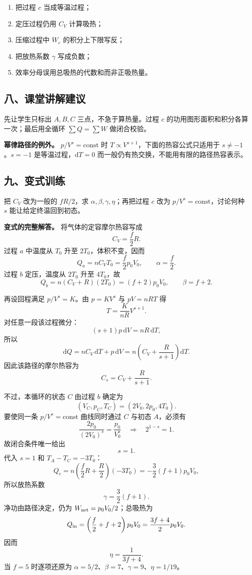 \documentclass[12pt,a4paper,UTF8]{ctexart}
\newcommand{\tightlist}{\setlength{\itemsep}{0pt}\setlength{\parskip}{0pt}}
\begin{document}
\begin{enumerate}
\def\labelenumi{\arabic{enumi}.}
\tightlist
\item
  把过程 \(c\) 当成等温过程；
\item
  定压过程仍用 \(C_V\) 计算吸热；
\item
  压缩过程中 \(W_c\) 的积分上下限写反；
\item
  把放热系数 \(\gamma\) 写成负数；
\item
  效率分母误用总吸热的代数和而非正吸热量。
\end{enumerate}

\subsection{八、课堂讲解建议}\label{ux516bux8bfeux5802ux8bb2ux89e3ux5efaux8bae-5}

先让学生只标出 \(A,B,C\) 三点，不急于算热量。过程 \(c\)
的功用图形面积和积分各算一次；最后用全循环 \(\sum Q=\sum W\)
做闭合校验。

\textbf{幂律路径的例外。} \(p/V^s=\mathrm{const}\) 时
\(T\propto V^{s+1}\)，下面的热容公式只适用于 \(s\ne-1\)。\(s=-1\)
是等温过程，\(\mathrm dT=0\)
而一般仍有热交换，不能用有限的路径热容表示。

\subsection{九、变式训练}\label{ux4e5dux53d8ux5f0fux8badux7ec3-5}

把 \(C_V\) 改为一般的 \(fR/2\)，求
\(\alpha,\beta,\gamma,\eta\)；再把过程 \(c\) 改为
\(p/V^s=\mathrm{const}\)，讨论何种 \(s\) 能让给定终温回到初态。

\textbf{变式的完整解答。} 将气体的定容摩尔热容写成 \[
C_V=\frac f2R.
\] 过程 \(a\) 中温度从 \(T_0\) 升至 \(2T_0\)，体积不变，因而 \[
Q_a=nC_VT_0=\frac f2p_0V_0,
\qquad
\boxed{\alpha=\frac f2}.
\] 过程 \(b\) 定压，温度从 \(2T_0\) 升至 \(4T_0\)，故 \[
Q_b=n(C_V+R)(2T_0)
=(f+2)p_0V_0,
\qquad
\boxed{\beta=f+2}.
\]

再设回程满足 \(p/V^s=K\)。由 \(p=KV^s\) 与 \(pV=nRT\) 得 \[
T=\frac K{nR}V^{s+1}.
\] 对任意一段该过程微分： \[
(s+1)p\,\mathrm dV=nR\,\mathrm dT,
\] 所以 \[
\mathrm dQ
=nC_V\,\mathrm dT+p\,\mathrm dV
=n\left(C_V+\frac{R}{s+1}\right)\mathrm dT.
\] 因此该路径的摩尔热容为 \[
\boxed{C_s=C_V+\frac R{s+1}}.
\]

不过，本循环的状态 \(C\) 由过程 \(b\) 确定为 \[
(V_C,p_C,T_C)=(2V_0,2p_0,4T_0).
\] 要使同一条 \(p/V^s=\text{const}\) 曲线同时通过 \(C\) 与初态
\(A\)，必须有 \[
\frac{2p_0}{(2V_0)^s}
=\frac{p_0}{V_0^s}
\quad\Longrightarrow\quad
2^{1-s}=1.
\] 故闭合条件唯一给出 \[
\boxed{s=1}.
\] 代入 \(s=1\) 和 \(T_A-T_C=-3T_0\)： \[
Q_c
=n\left(\frac f2R+\frac R2\right)(-3T_0)
=-\frac32(f+1)p_0V_0,
\] 所以放热系数 \[
\boxed{\gamma=\frac32(f+1)}.
\] 净功由路径决定，仍为 \(W_{\rm net}=p_0V_0/2\)；总吸热为 \[
Q_{\rm in}
=\left(\frac f2+f+2\right)p_0V_0
=\frac{3f+4}{2}p_0V_0.
\] 因而 \[
\boxed{\eta=\frac1{3f+4}}.
\] 当 \(f=5\) 时逐项还原为
\(\alpha=5/2\)、\(\beta=7\)、\(\gamma=9\)、\(\eta=1/19\)。
\end{document}
